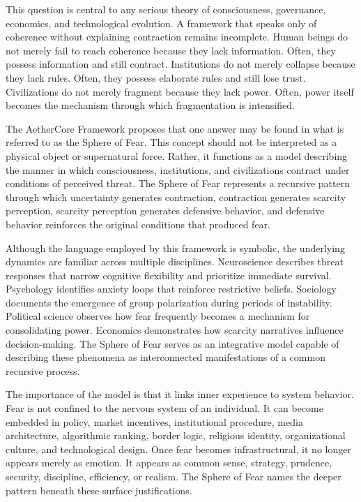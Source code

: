 \documentclass[12pt]{article}
\begin{document}
This question is central to any serious theory of consciousness, governance, economics, and technological evolution. A framework that speaks only of coherence without explaining contraction remains incomplete. Human beings do not merely fail to reach coherence because they lack information. Often, they possess information and still contract. Institutions do not merely collapse because they lack rules. Often, they possess elaborate rules and still lose trust. Civilizations do not merely fragment because they lack power. Often, power itself becomes the mechanism through which fragmentation is intensified.

The AetherCore Framework proposes that one answer may be found in what is referred to as the Sphere of Fear. This concept should not be interpreted as a physical object or supernatural force. Rather, it functions as a model describing the manner in which consciousness, institutions, and civilizations contract under conditions of perceived threat. The Sphere of Fear represents a recursive pattern through which uncertainty generates contraction, contraction generates scarcity perception, scarcity perception generates defensive behavior, and defensive behavior reinforces the original conditions that produced fear.

Although the language employed by this framework is symbolic, the underlying dynamics are familiar across multiple disciplines. Neuroscience describes threat responses that narrow cognitive flexibility and prioritize immediate survival. Psychology identifies anxiety loops that reinforce restrictive beliefs. Sociology documents the emergence of group polarization during periods of instability. Political science observes how fear frequently becomes a mechanism for consolidating power. Economics demonstrates how scarcity narratives influence decision-making. The Sphere of Fear serves as an integrative model capable of describing these phenomena as interconnected manifestations of a common recursive process.

The importance of the model is that it links inner experience to system behavior. Fear is not confined to the nervous system of an individual. It can become embedded in policy, market incentives, institutional procedure, media architecture, algorithmic ranking, border logic, religious identity, organizational culture, and technological design. Once fear becomes infrastructural, it no longer appears merely as emotion. It appears as common sense, strategy, prudence, security, discipline, efficiency, or realism. The Sphere of Fear names the deeper pattern beneath these surface justifications.
\end{document}
